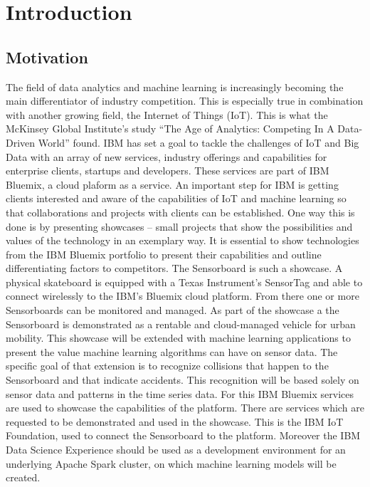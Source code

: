 \chapter{Introduction}
\label{ch:Introduction}

\section{Motivation}
\label{sec:Motivation}
The field of data analytics and machine learning is increasingly becoming the main differentiator of industry competition. This is especially true in combination with another growing field, the Internet of Things (IoT). This is what the McKinsey Global Institute’s study ``The Age of Analytics: Competing In A Data-Driven World'' found.\cite{mck} IBM has set a goal to tackle the challenges of IoT and Big Data with an array of new services, industry offerings and capabilities for enterprise clients, startups and developers. These services are part of IBM Bluemix, a cloud plaform  as a service. 
\newline
An important step for IBM is getting clients interested and aware of the capabilities of IoT and machine learning so that collaborations and projects with clients can be established. One way this is done is by presenting showcases – small projects that show the possibilities and values of the technology in an exemplary way. It is essential to show technologies from the IBM Bluemix portfolio to present their capabilities and outline differentiating factors to competitors.
 \newline
The Sensorboard is such a showcase. A physical skateboard is equipped with a Texas Instrument’s SensorTag and able to connect wirelessly to the IBM's Bluemix cloud platform. From there one or more Sensorboards can be monitored and managed. As part of the showcase a the Sensorboard is demonstrated as a rentable and cloud-managed vehicle for urban mobility.
 \newline
This showcase will be extended with machine learning applications to present the value machine learning algorithms can have on sensor data. The specific goal of that extension is to recognize collisions that happen to the Sensorboard and that indicate accidents. This recognition will be based solely on sensor data and  patterns in the time series data. For this IBM Bluemix services are used to showcase the capabilities of the platform. There are services which are requested to be demonstrated and used in the showcase. This is the IBM IoT Foundation, used to connect the Sensorboard to the platform. Moreover the IBM Data Science Experience should be used as a development environment for an underlying Apache Spark cluster, on which machine learning models will be created.

